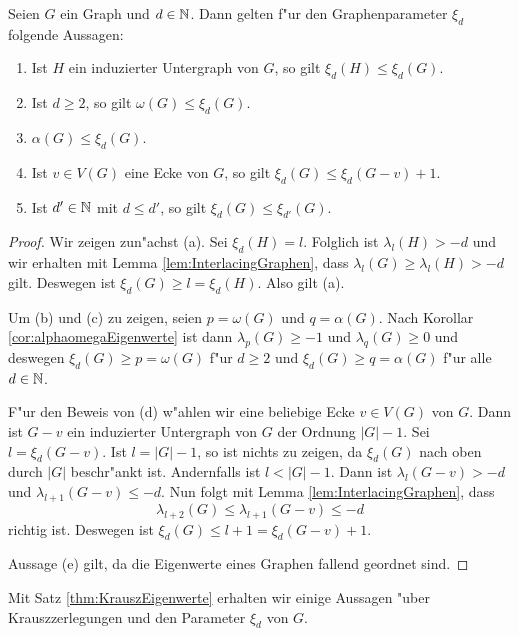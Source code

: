 \begin{lemma}
  Seien $G$ ein Graph und $d\in {\mathbb{N}}$. Dann gelten f"ur den Graphenparameter $\xi_d$ folgende Aussagen:
  \begin{enumerate}[label={\rm(\alph*)}]
    \item Ist $H$ ein induzierter Untergraph von $G$, so gilt $\xi_{d}(H) \leq \xi_{d}(G)$.
    \item Ist $d\geq 2$, so gilt $\omega(G) \leq \xi_{d}(G)$.
    \item $\alpha(G) \leq \xi_{d}(G)$. 
    \item Ist $v\in V(G)$ eine Ecke von $G$, so gilt $\xi_{d}(G) \leq \xi_{d}(G-v) +1$.
    \item Ist $d'\in{\mathbb{N}}$ mit $d \leq d'$, so gilt $\xi_{d}(G) \leq \xi_{d'}(G)$.
  \end{enumerate}
  \label{lem:xieigenschaften}
\end{lemma}

\begin{proof}
  Wir zeigen zun"achst (a). Sei $\xi_{d}(H) = l$. Folglich ist $\lambda_{l}(H) > -d$ und wir erhalten mit Lemma \ref{lem:InterlacingGraphen}, dass $\lambda_{l}(G) \geq \lambda_{l}(H) > -d$ gilt. Deswegen ist $\xi_{d}(G) \geq l = \xi_{d}(H)$. Also gilt (a).

  Um (b) und (c) zu zeigen, seien $p = \omega(G)$ und $q=\alpha(G)$. Nach Korollar \ref{cor:alphaomegaEigenwerte} ist dann $\lambda_{p}(G) \geq -1$ und $\lambda_q(G) \geq 0$ und deswegen $\xi_{d}(G) \geq p = \omega(G)$ f"ur $d \geq 2$ und $\xi_{d}(G) \geq q = \alpha(G)$ f"ur alle $d \in {\mathbb{N}}$. 

  F"ur den Beweis von (d) w"ahlen wir eine beliebige Ecke $v\in V(G)$ von $G$. Dann ist $G-v$ ein induzierter Untergraph von $G$ der Ordnung $|G|-1$. Sei $l=\xi_{d}(G-v)$. Ist $l= |G|-1$, so ist nichts zu zeigen, da $\xi_d(G)$ nach oben durch $|G|$ beschr"ankt ist. Andernfalls ist $l< |G| -1$. 
  Dann ist $\lambda_{l}(G-v) > -d$ und $\lambda_{l+1}(G-v) \leq -d$. Nun folgt mit Lemma \ref{lem:InterlacingGraphen}, dass $$\lambda_{l+2}(G) \leq \lambda_{l+1}(G-v) \leq -d$$ richtig ist. Deswegen ist $\xi_{d}(G) \leq l+1 = \xi_{d}(G-v) +1$. 

  Aussage (e) gilt, da die Eigenwerte eines Graphen fallend geordnet sind.
\end{proof}

Mit Satz \ref{thm:KrauszEigenwerte} erhalten wir einige Aussagen "uber Krauszzerlegungen und den Parameter $\xi_{d}$ von $G$.

